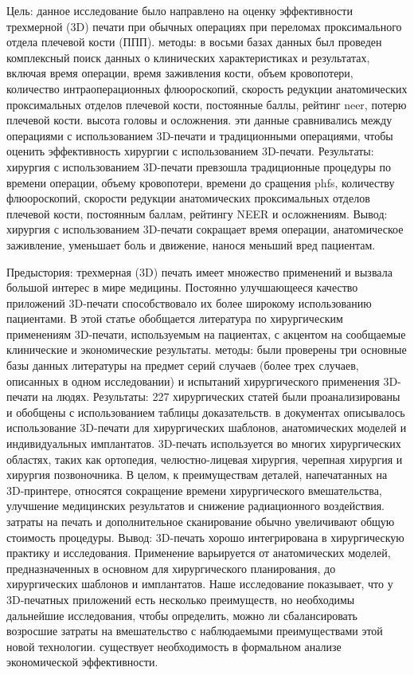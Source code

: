 Цель: данное исследование было направлено на оценку эффективности трехмерной
(3D) печати при обычных операциях при переломах проксимального отдела плечевой
кости (ППП). методы: в восьми базах данных был проведен комплексный поиск данных
о клинических характеристиках и результатах, включая время операции, время
заживления кости, объем кровопотери, количество интраоперационных флюороскопий,
скорость редукции анатомических проксимальных отделов плечевой кости, постоянные
баллы, рейтинг neer, потерю плечевой кости. высота головы и осложнения. эти
данные сравнивались между операциями с использованием 3D-печати и традиционными
операциями, чтобы оценить эффективность хирургии с использованием 3D-печати.
Результаты: хирургия с использованием 3D-печати превзошла традиционные процедуры
по времени операции, объему кровопотери, времени до сращения phfs, количеству
флюороскопий, скорости редукции анатомических проксимальных отделов плечевой
кости, постоянным баллам, рейтингу NEER и осложнениям. Вывод: хирургия с
использованием 3D-печати сокращает время операции, анатомическое заживление,
уменьшает боль и движение, нанося меньший вред пациентам.\cite{li2022}

Предыстория: трехмерная (3D) печать имеет множество применений и вызвала большой
интерес в мире медицины. Постоянно улучшающееся качество приложений 3D-печати
способствовало их более широкому использованию пациентами. В этой статье
обобщается литература по хирургическим применениям 3D-печати, используемым на
пациентах, с акцентом на сообщаемые клинические и экономические результаты.
методы: были проверены три основные базы данных литературы на предмет серий
случаев (более трех случаев, описанных в одном исследовании) и испытаний
хирургического применения 3D-печати на людях. Результаты: 227 хирургических
статей были проанализированы и обобщены с использованием таблицы доказательств.
в документах описывалось использование 3D-печати для хирургических шаблонов,
анатомических моделей и индивидуальных имплантатов. 3D-печать используется во
многих хирургических областях, таких как ортопедия, челюстно-лицевая хирургия,
черепная хирургия и хирургия позвоночника. В целом, к преимуществам деталей,
напечатанных на 3D-принтере, относятся сокращение времени хирургического
вмешательства, улучшение медицинских результатов и снижение радиационного
воздействия. затраты на печать и дополнительное сканирование обычно увеличивают
общую стоимость процедуры. Вывод: 3D-печать хорошо интегрирована в хирургическую
практику и исследования. Применение варьируется от анатомических моделей,
предназначенных в основном для хирургического планирования, до хирургических
шаблонов и имплантатов. Наше исследование показывает, что у 3D-печатных
приложений есть несколько преимуществ, но необходимы дальнейшие исследования,
чтобы определить, можно ли сбалансировать возросшие затраты на вмешательство с
наблюдаемыми преимуществами этой новой технологии. существует необходимость в
формальном анализе экономической эффективности.\cite{tack2016}

